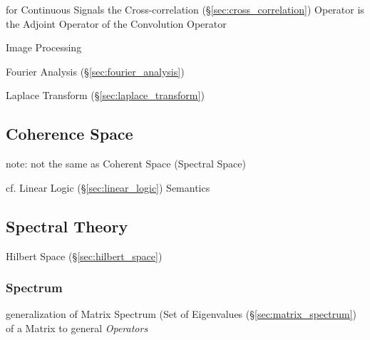 for Continuous Signals the Cross-correlation (\S\ref{sec:cross_correlation})
Operator is the Adjoint Operator of the Convolution Operator

Image Processing

\fist Fourier Analysis (\S\ref{sec:fourier_analysis})

Laplace Transform (\S\ref{sec:laplace_transform})



\subsection{Coherence Space}\label{sec:coherence_space}

note: not the same as Coherent Space (Spectral Space)

cf. Linear Logic (\S\ref{sec:linear_logic}) Semantics



\subsection{Spectral Theory}\label{sec:spectral_theory}

Hilbert Space (\S\ref{sec:hilbert_space})



\subsubsection{Spectrum}\label{sec:spectrum}

generalization of Matrix Spectrum (Set of Eigenvalues
(\S\ref{sec:matrix_spectrum}) of a Matrix to general \emph{Operators}

